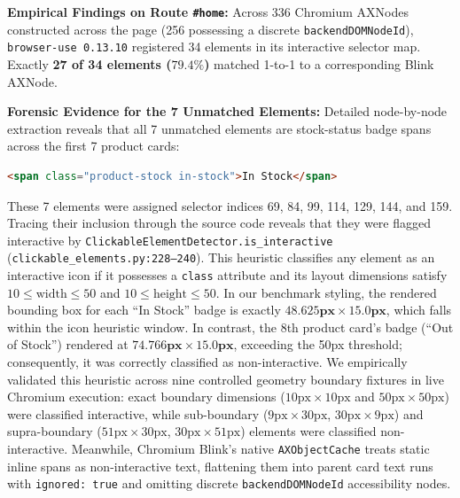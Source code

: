 \documentclass[11pt,a4paper]{article}
\begin{document}
\textbf{Empirical Findings on Route \texttt{\#home}:}
Across 336 Chromium AXNodes constructed across the page (256 possessing a discrete \texttt{backendDOMNodeId}), \texttt{browser-use 0.13.10} registered 34 elements in its interactive selector map. Exactly \textbf{27 of 34 elements ($79.4\%$)} matched 1-to-1 to a corresponding Blink AXNode.

\textbf{Forensic Evidence for the 7 Unmatched Elements:}
Detailed node-by-node extraction reveals that all 7 unmatched elements are stock-status badge spans across the first 7 product cards:
\begin{lstlisting}[language=HTML]
<span class="product-stock in-stock">In Stock</span>
\end{lstlisting}
These 7 elements were assigned selector indices 69, 84, 99, 114, 129, 144, and 159. Tracing their inclusion through the source code reveals that they were flagged interactive by \texttt{ClickableElementDetector.is\_interactive} (\texttt{clickable\_elements.py:228--240}). This heuristic classifies any element as an interactive icon if it possesses a \texttt{class} attribute and its layout dimensions satisfy $10 \le \text{width} \le 50$ and $10 \le \text{height} \le 50$. In our benchmark styling, the rendered bounding box for each ``In Stock'' badge is exactly $\mathbf{48.625\text{px} \times 15.0\text{px}}$, which falls within the icon heuristic window. In contrast, the 8th product card's badge (``Out of Stock'') rendered at $\mathbf{74.766\text{px} \times 15.0\text{px}}$, exceeding the 50px threshold; consequently, it was correctly classified as non-interactive. We empirically validated this heuristic across nine controlled geometry boundary fixtures in live Chromium execution: exact boundary dimensions ($10\text{px} \times 10\text{px}$ and $50\text{px} \times 50\text{px}$) were classified interactive, while sub-boundary ($9\text{px} \times 30\text{px}$, $30\text{px} \times 9\text{px}$) and supra-boundary ($51\text{px} \times 30\text{px}$, $30\text{px} \times 51\text{px}$) elements were classified non-interactive. Meanwhile, Chromium Blink's native \texttt{AXObjectCache} treats static inline spans as non-interactive text, flattening them into parent card text runs with \texttt{ignored: true} and omitting discrete \texttt{backendDOMNodeId} accessibility nodes.
\end{document}
